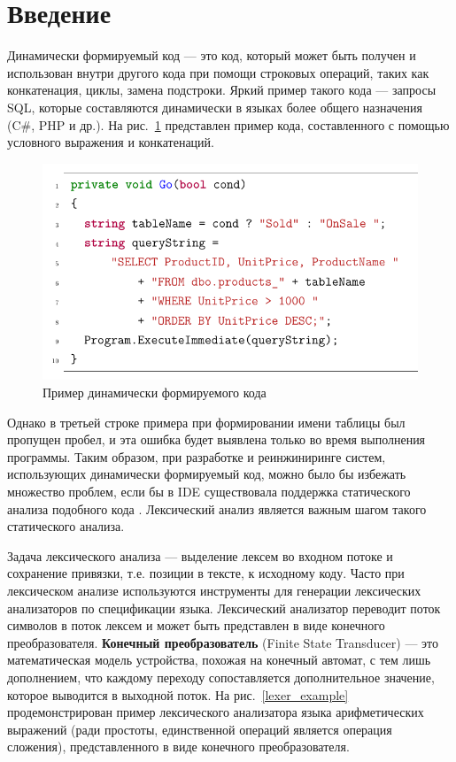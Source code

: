
\section*{Введение}
Динамически формируемый код — это код, который может быть получен и использован внутри другого кода при помощи строковых операций, таких как конкатенация, циклы, замена подстроки. Яркий пример такого кода — запросы SQL, которые составляются динамически в языках более общего назначения (C\#, PHP и др.). На рис.~\ref{code_sample_1} представлен пример кода, составленного с помощью условного выражения и конкатенаций. 

\begin{figure}[h]
\centering
\includegraphics[width=\textwidth]{Baygeldin/pictures/intro_code.pdf}
\caption{Пример динамически формируемого кода}
\label{code_sample_1}
\end{figure}

Однако в третьей строке примера при формировании имени таблицы был пропущен пробел, и эта ошибка будет выявлена только во время выполнения программы. Таким образом, при разработке и реинжиниринге систем, использующих динамически формируемый код, можно было бы избежать множество проблем, если бы в IDE существовала поддержка статического анализа подобного кода \cite{string_embedded}. Лексический анализ является важным шагом такого статического анализа.

Задача лексического анализа — выделение лексем во входном потоке и сохранение привязки, т.е. позиции в тексте, к исходному коду. Часто при лексическом анализе используются инструменты для генерации лексических анализаторов по спецификации языка. Лексический анализатор переводит поток символов в поток лексем и может быть представлен в виде конечного преобразователя. \textbf{Конечный преобразователь} (Finite State Transducer) — это математическая модель устройства, похожая на конечный автомат, с тем лишь дополнением, что каждому переходу сопоставляется дополнительное значение, которое выводится в выходной поток. На рис.~\ref{lexer_example} продемонстрирован пример лексического анализатора языка арифметических выражений (ради простоты, единственной операций является операция сложения), представленного в виде конечного преобразователя.

